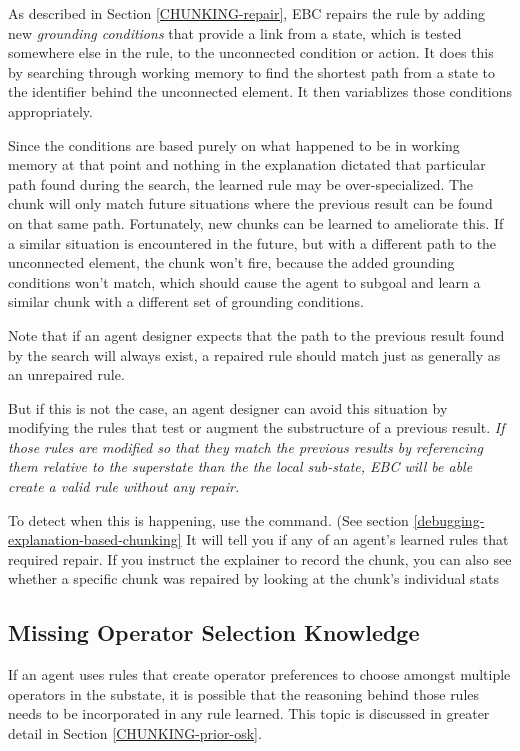 As described in Section \ref{CHUNKING-repair}, EBC repairs the rule by adding new  \textit{grounding conditions} that provide a link from a state, which is tested somewhere else in the rule, to the unconnected condition or action. It does this by searching through working memory to find the shortest path from a state to the identifier behind the unconnected element.  It then variablizes those conditions appropriately.   

Since the conditions are based purely on what happened to be in working memory at that point and nothing in the explanation dictated that particular path found during the search, the learned rule may be over-specialized.  The chunk will only match future situations where the previous result can be found on that same path.  Fortunately, new chunks can be learned to ameliorate this.  If a similar situation is encountered in the future, but with a different path to the unconnected element, the chunk won't fire, because the added grounding conditions won't match, which should cause the agent to subgoal and learn a similar chunk with a different set of grounding conditions.

Note that if an agent designer expects that the path to the previous result found by the search will always exist, a repaired rule should match just as generally as an unrepaired rule.

But if this is not the case, an agent designer can avoid this situation by modifying the rules that test or augment the substructure of a previous result.  \emph{If those rules are modified so that they match the previous results by referencing them relative to the superstate than the the local sub-state, EBC will be able create a valid rule without any repair.}

To detect when this is happening, use the  command. (See section \ref{debugging-explanation-based-chunking} It will tell you if any of an agent's learned rules that required repair.  If you instruct the explainer to record the chunk, you can also see whether a specific chunk was repaired by looking at the chunk's individual stats

\subsection{Missing Operator Selection Knowledge}

If an agent uses rules that create operator preferences to choose amongst multiple operators in the substate, it is possible that the reasoning behind those rules needs to be incorporated in any rule learned.  This topic is discussed in greater detail in Section \ref{CHUNKING-prior-osk}.  

